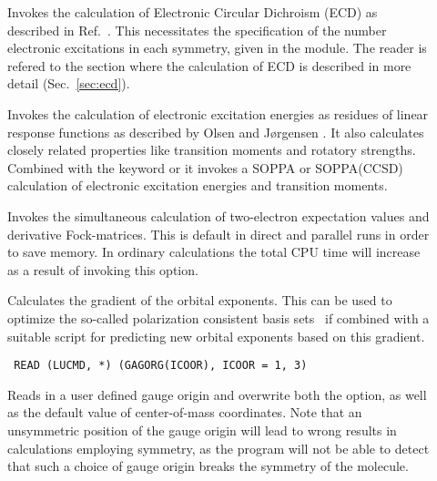 \begin{description}
\item[] Invokes the calculation of Electronic Circular
Dichroism (ECD) as
described in Ref.~\cite{klbaehkrthjopjtca90,mpkrthcpl388}. This 
necessitates the specification of the number electronic
excitations in 
each symmetry, given in the  module. The reader is
refered to the section where the calculation of ECD is described in
more detail (Sec.~\ref{sec:ecd}).

\item[] Invokes the calculation of electronic
excitation
energies as residues of linear response functions
as described by Olsen and J\o rgensen \cite{jopjjcp82}. It also
calculates closely related properties like transition
moments and 
rotatory strengths. Combined with the 
keyword  or  it invokes a SOPPA 
or SOPPA(CCSD) calculation of electronic
excitation energies and transition moments.


\item[] Invokes the simultaneous calculation of
two-electron expectation values and derivative Fock-matrices. This is
default in direct and parallel runs in order to save memory. In
ordinary calculations the total CPU time will increase as a result of
invoking this option.

\item[] Calculates the gradient of the orbital
  exponents. This can be used to optimize the so-called polarization
  consistent basis sets~\cite{gjjcp115} if combined with a suitable script for
  predicting new orbital exponents based on this gradient.

\item[]\verb| |\newline
\verb|READ (LUCMD, *) (GAGORG(ICOOR), ICOOR = 1, 3)|

Reads in a user defined gauge origin and overwrite
both the  option, as well as the default value of
center-of-mass coordinates. Note that an unsymmetric position of the
gauge origin will lead to wrong results in calculations employing
symmetry, as the program will not be able to detect that such a choice
of gauge origin breaks the symmetry of the molecule.


\end{description}
